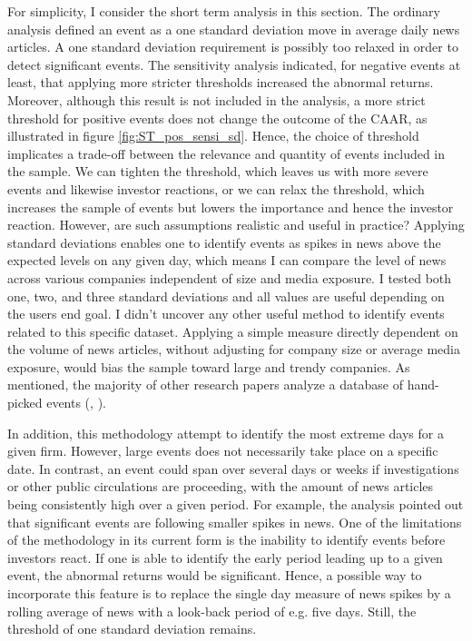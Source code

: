 For simplicity, I consider the short term analysis in this section. The ordinary analysis defined an event as a one standard deviation move in average daily news articles. A one standard deviation requirement is possibly too relaxed in order to detect significant events. The sensitivity analysis indicated, for negative events at least, that applying more stricter thresholds increased the abnormal returns. Moreover, although this result is not included in the analysis, a more strict threshold for positive events does not change the outcome of the CAAR, as illustrated in figure \ref{fig:ST_pos_sensi_sd}. Hence, the choice of threshold implicates a trade-off between the relevance and quantity of events included in the sample. We can tighten the threshold, which leaves us with more severe events and likewise investor reactions, or we can relax the threshold, which increases the sample of events but lowers the importance and hence the investor reaction. However, are such assumptions realistic and useful in practice? Applying standard deviations enables one to identify events as spikes in news above the expected levels on any given day, which means I can compare the level of news across various companies independent of size and media exposure. I tested both one, two, and three standard deviations and all values are useful depending on the users end goal. I didn't uncover any other useful method to identify events related to this specific dataset. Applying a simple measure directly dependent on the volume of news articles, without adjusting for company size or average media exposure, would bias the sample toward large and trendy companies. As mentioned, the majority of other research papers analyze a database of hand-picked events (\cite{Blancard_ESG_sentiment}, \cite{kruger2015corporate}). 

In addition, this methodology attempt to identify the most extreme days for a given firm. However, large events does not necessarily take place on a specific date. In contrast, an event could span over several days or weeks if investigations or other public circulations are proceeding, with the amount of news articles being consistently high over a given period. For example, the analysis pointed out that significant events are following smaller spikes in news. One of the limitations of the methodology in its current form is the inability to identify events before investors react. If one is able to identify the early period leading up to a given event, the  abnormal returns would be significant. Hence, a possible way to incorporate this feature is to replace the single day measure of news spikes by a rolling average of news with a look-back period of e.g. five days. Still, the threshold of one standard deviation remains. 

